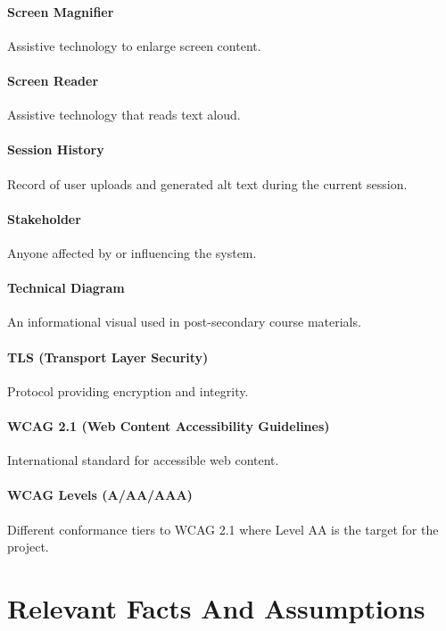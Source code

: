 \documentclass[12pt]{article}
\begin{document}
\paragraph*{Screen Magnifier}
Assistive technology to enlarge screen content.

\paragraph*{Screen Reader}
Assistive technology that reads text aloud.

\paragraph*{Session History}
 Record of user uploads and generated alt text during the current session.

 \paragraph*{Stakeholder}
 Anyone affected by or influencing the system.

 \paragraph*{Technical Diagram}
 An informational visual used in post-secondary course materials. 

 \paragraph*{TLS (Transport Layer Security)}
 Protocol providing encryption and integrity.

 \paragraph*{WCAG 2.1 (Web Content Accessibility Guidelines)}
 International standard for accessible web content.

 \paragraph*{WCAG Levels (A/AA/AAA)}
 Different conformance tiers to WCAG 2.1 where Level AA is the target for the project.


\section{Relevant Facts And Assumptions}
\end{document}
